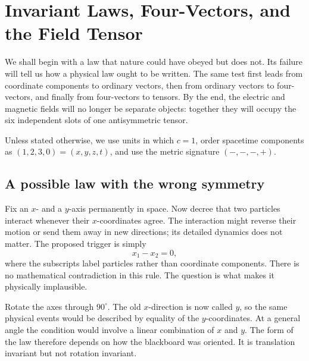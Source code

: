 \chapter{Invariant Laws, Four-Vectors, and the Field Tensor}

We shall begin with a law that nature could have obeyed but does not. Its
failure will tell us how a physical law ought to be written. The same test
first leads from coordinate components to ordinary vectors, then from
ordinary vectors to four-vectors, and finally from four-vectors to tensors.
By the end, the electric and magnetic fields will no longer be separate
objects: together they will occupy the six independent slots of one
antisymmetric tensor.

Unless stated otherwise, we use units in which \(c=1\), order spacetime
components as \((1,2,3,0)=(x,y,z,t)\), and use the metric signature
\((-,-,-,+)\).

\section{A possible law with the wrong symmetry}

Fix an \(x\)- and a \(y\)-axis permanently in space. Now decree that two
particles interact whenever their \(x\)-coordinates agree. The interaction
might reverse their motion or send them away in new directions; its detailed
dynamics does not matter. The proposed trigger is simply
\begin{equation}
  x_1-x_2=0,
\end{equation}
where the subscripts label particles rather than coordinate components.
There is no mathematical contradiction in this rule. The question is what
makes it physically implausible.

\begin{classroomqa}
\end{classroomqa}

Rotate the axes through \(90^\circ\). The old \(x\)-direction is now called
\(y\), so the same physical events would be described by equality of the
\(y\)-coordinates. At a general angle the condition would involve a linear
combination of \(x\) and \(y\). The form of the law therefore depends on how
the blackboard was oriented. It is translation invariant but not rotation
invariant.

